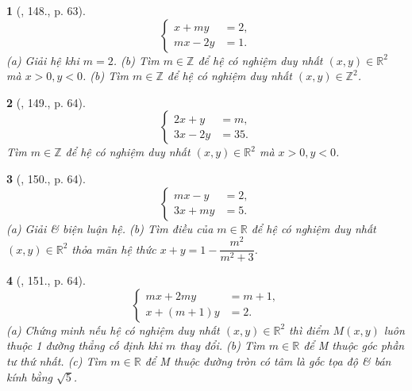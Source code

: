 \documentclass{article}
\newtheorem{baitoan}{}
\begin{document}
\begin{baitoan}[\cite{Dong_23_1001_toan_I}, 148., p. 63]
	\begin{equation*}
		\left\{\begin{split}
			x + my &= 2,\\
			mx - 2y &= 1.
		\end{split}\right.
	\end{equation*}
	(a) Giải hệ khi $m = 2$. (b) Tìm $m\in\mathbb{Z}$ để hệ có nghiệm duy nhất $(x,y)\in\mathbb{R}^2$ mà $x > 0,y < 0$. (b) Tìm $m\in\mathbb{Z}$ để hệ có nghiệm duy nhất $(x,y)\in\mathbb{Z}^2$.
\end{baitoan}

\begin{baitoan}[\cite{Dong_23_1001_toan_I}, 149., p. 64]
	\begin{equation*}
		\left\{\begin{split}
			2x + y &= m,\\
			3x - 2y &= 35.
		\end{split}\right.
	\end{equation*}
	Tìm $m\in\mathbb{Z}$ để hệ có nghiệm duy nhất $(x,y)\in\mathbb{R}^2$ mà $x > 0,y < 0$.
\end{baitoan}

\begin{baitoan}[\cite{Dong_23_1001_toan_I}, 150., p. 64]
	\begin{equation*}
		\left\{\begin{split}
			mx - y &= 2,\\
			3x + my &= 5.
		\end{split}\right.
	\end{equation*}
	(a) Giải \& biện luận hệ. (b) Tìm điều của $m\in\mathbb{R}$ để hệ có nghiệm duy nhất $(x,y)\in\mathbb{R}^2$ thỏa mãn hệ thức $x + y = 1 - \dfrac{m^2}{m^2 + 3}$.
\end{baitoan}

\begin{baitoan}[\cite{Dong_23_1001_toan_I}, 151., p. 64]
	\begin{equation*}
		\left\{\begin{split}
			mx + 2my &= m + 1,\\
			x + (m + 1)y &= 2.
		\end{split}\right.
	\end{equation*}
	(a) Chứng minh nếu hệ có nghiệm duy nhất $(x,y)\in\mathbb{R}^2$ thì điểm $M(x,y)$ luôn thuộc 1 đường thẳng cố định khi $m$ thay đổi. (b) Tìm $m\in\mathbb{R}$ để M thuộc góc phần tư thứ nhất. (c) Tìm $m\in\mathbb{R}$ để M thuộc đường tròn có tâm là gốc tọa độ \& bán kính bằng $\sqrt{5}$.
\end{baitoan}
\end{document}
